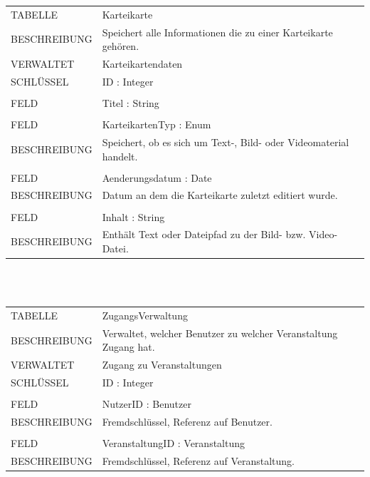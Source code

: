 \documentclass[12pt,a4paper]{article}
\begin{document}
\begin{tabular}{|lp{12cm}|}
	\hline
	TABELLE			&  Karteikarte\\ 
	BESCHREIBUNG	&  Speichert alle Informationen die zu einer Karteikarte gehören.\\ 
	VERWALTET		&  Karteikartendaten\\ 
	SCHLÜSSEL		&  ID : Integer\\ 
	\hline
	&  \\ 
	FELD		    &  Titel : String\\  
	&  \\
	FELD		    &  KarteikartenTyp : Enum\\ 
	BESCHREIBUNG	&  Speichert, ob es sich um Text-, Bild- oder Videomaterial handelt.\\
	&  \\
	FELD		    &  Aenderungsdatum : Date\\ 
	BESCHREIBUNG	&  Datum an dem die Karteikarte zuletzt editiert wurde.\\ 
	&  \\
	FELD		    &  Inhalt : String\\ 
	BESCHREIBUNG	&  Enthält Text oder Dateipfad zu der Bild- bzw. Video-Datei.\\
	\hline
\end{tabular}\\\\

\begin{tabular}{|lp{12cm}|}
	\hline
	TABELLE			&  ZugangsVerwaltung\\ 
	BESCHREIBUNG	&  Verwaltet, welcher Benutzer zu welcher Veranstaltung Zugang hat.\\ 
	VERWALTET		&  Zugang zu Veranstaltungen\\ 
	SCHLÜSSEL		&  ID : Integer\\ 
	\hline
	&  \\
	FELD		    &  NutzerID : Benutzer\\ 
	BESCHREIBUNG	&  Fremdschlüssel, Referenz auf Benutzer.\\
	&  \\
	FELD		    &  VeranstaltungID : Veranstaltung\\ 
	BESCHREIBUNG	&  Fremdschlüssel, Referenz auf Veranstaltung.\\
	\hline
\end{tabular}\\\\
\end{document}

